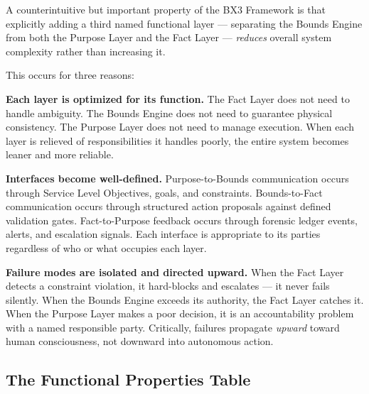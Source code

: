 \documentclass[12pt]{article}
\begin{document}
A counterintuitive but important property of the BX3 Framework is that explicitly adding a third named functional layer --- separating the Bounds Engine from both the Purpose Layer and the Fact Layer --- \textit{reduces} overall system complexity rather than increasing it.

This occurs for three reasons:

\textbf{Each layer is optimized for its function.} The Fact Layer does not need to handle ambiguity. The Bounds Engine does not need to guarantee physical consistency. The Purpose Layer does not need to manage execution. When each layer is relieved of responsibilities it handles poorly, the entire system becomes leaner and more reliable.

\textbf{Interfaces become well-defined.} Purpose-to-Bounds communication occurs through Service Level Objectives, goals, and constraints. Bounds-to-Fact communication occurs through structured action proposals against defined validation gates. Fact-to-Purpose feedback occurs through forensic ledger events, alerts, and escalation signals. Each interface is appropriate to its parties regardless of who or what occupies each layer.

\textbf{Failure modes are isolated and directed upward.} When the Fact Layer detects a constraint violation, it hard-blocks and escalates --- it never fails silently. When the Bounds Engine exceeds its authority, the Fact Layer catches it. When the Purpose Layer makes a poor decision, it is an accountability problem with a named responsible party. Critically, failures propagate \textit{upward} toward human consciousness, not downward into autonomous action.

\subsection{The Functional Properties Table}
\end{document}
